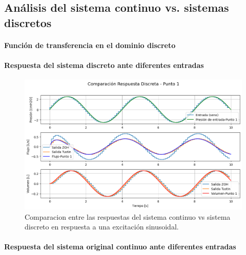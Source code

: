 \documentclass[journal]{IEEEtran}
\begin{document}
\subsection{Análisis del sistema continuo vs. sistemas discretos}

\paragraph{Función de transferencia en el dominio discreto}



\paragraph{Respuesta del sistema discreto ante diferentes entradas}


\begin{figure}[h!]
    \centering
    \includegraphics[width=1\linewidth]{Comparacion_P4.png}
    \caption{Comparacion entre las respuestas del sistema continuo vs sistema discreto en respuesta a una excitación sinusoidal.}
    \label{fig:simulacion_P4}
\end{figure}

\paragraph{Respuesta del sistema original continuo ante diferentes entradas}
\end{document}
